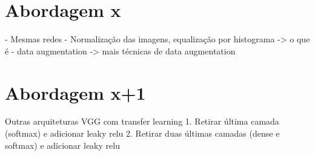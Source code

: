 \section{Abordagem x}

- Mesmas redes
- Normalização das imagens, equalização por histograma -> o que é
- data augmentation ->  mais técnicas de data augmentation

\section{Abordagem x+1}

Outras arquiteturas
VGG
com transfer learning
1. Retirar última camada (softmax) e adicionar leaky relu
2. Retirar duas últimas camadas (dense e softmax) e adicionar leaky relu
